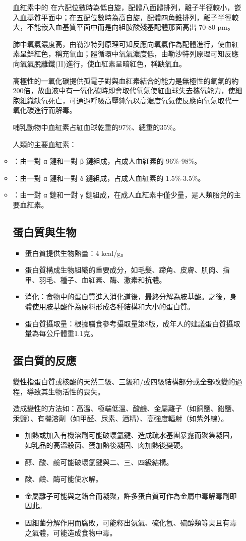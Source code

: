 \documentclass[a4paper,12pt]{report}
\begin{document}
\begin{itemize}
\begin{itemize}
血紅素中的  在六配位數時為低自旋，配體八面體排列，離子半徑較小，嵌入血基質平面中；在五配位數時為高自旋，配體四角錐排列，離子半徑較大，不能嵌入血基質平面中而是向組胺酸殘基配體那面高出 70-80 pm。

肺中氧氣濃度高，由勒沙特列原理可知反應向氧氣作為配體進行，使血紅素呈鮮紅色，稱充氧血；體循環中氧氣濃度低，由勒沙特列原理可知反應向氧氣脫離鐵(II)進行，使血紅素呈暗紅色，稱缺氧血。

高極性的一氧化碳提供孤電子對與血紅素結合的能力是無極性的氧氣的約200倍，故血液中有一氧化碳時即會取代氧氣使紅血球失去攜氧能力，使細胞組織缺氧死亡，可通過呼吸高壓純氧以高濃度氧氣使反應向氧氣取代一氧化碳進行而解毒。

哺乳動物中血紅素占紅血球乾重的97\%、總重的35\%。

人類的主要血紅素：
\bit
\item {}：由一對 α 鏈和一對 β 鏈組成，占成人血紅素的 96\%-98\%。
\item {}：由一對 α 鏈和一對 δ 鏈組成，占成人血紅素的 1.5\%-3.5\%。
\item {}：由一對 α 鏈和一對 γ 鏈組成，在成人血紅素中僅少量，是人類胎兒的主要血紅素。 
\eit
\subsection{蛋白質與生物}
\begin{itemize}
\item 蛋白質提供生物熱量：4 kcal/g。
\item 蛋白質構成生物組織的重要成分，如毛髮、蹄角、皮膚、肌肉、指甲、羽毛、種子、血紅素、酶、激素和抗體。
\item 消化：食物中的蛋白質進入消化道後，最終分解為胺基酸。之後，身體使用胺基酸作為原料形成各種結構和大小的蛋白質。
\item 蛋白質攝取量：根據膳食參考攝取量第8版，成年人的建議蛋白質攝取量為每公斤體重1.1克。
\end{itemize}
\subsection{蛋白質的反應}
變性指蛋白質或核酸的天然二級、三級和/或四級結構部分或全部改變的過程，導致其生物活性的喪失。

造成變性的方法如：高溫、極端低溫、酸鹼、金屬離子（如銅鹽、鉛鹽、汞鹽）、有機溶劑（如甲醛、尿素、酒精）、高強度輻射（如紫外線）。
\begin{itemize}
\item 加熱或加入有機溶劑可能破壞氫鍵、造成疏水基團暴露而聚集凝固，如乳品的高溫殺菌、蛋加熱後凝固、肉加熱後變硬。
\item 醇、酸、鹼可能破壞氫鍵與二、三、四級結構。
\item 酸、鹼、酶可能使水解。
\item 金屬離子可能與之錯合而凝聚，許多蛋白質可作為金屬中毒解毒劑即因此。
\item 因細菌分解作用而腐敗，可能釋出氨氣、硫化氫、硫醇類等臭且有毒之氣體，可能造成食物中毒。
\end{itemize}

\end{itemize}
\end{itemize}
\end{document}
